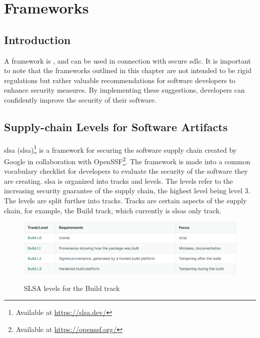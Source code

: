 \section{Frameworks}
\subsection{Introduction}
A framework is \textit{} \cite{FrameworkDefinition}, and can be used in connection with secure \acrshort{sdlc}. It is important to note that the frameworks outlined in this chapter are not intended to be rigid regulations but rather valuable recommendations for software developers to enhance security measures. By implementing these suggestions, developers can confidently improve the security of their software.

\subsection{Supply-chain Levels for Software Artifacts}
\acrlong{slsa} (\acrshort{slsa})\footnote{Available at \url{https://slsa.dev/}} is a framework for securing the software supply chain created by Google in collaboration with OpenSSF\footnote{Available at \url{https://openssf.org/}}. The framework is made into a common vocabulary checklist for developers to evaluate the security of the software they are creating. \acrshort{slsa} is organized into tracks and levels. The levels refer to the increasing security guarantee of the supply chain, the highest level being level 3. The levels are split further into tracks. Tracks are certain aspects of the supply chain, for example, the Build track, which currently is \acrshort{slsa}s only track. \cite{SLSAgeneral} 

\vspace{2mm}
\begin{figure}[H]
    \centering
    \includegraphics[width=0.8\columnwidth]{Images/slsalevels.png}
    \caption{SLSA levels for the Build track}\cite{SLSAlevels}
    \label{fig: SLSA levels for the Build track}
\end{figure}

